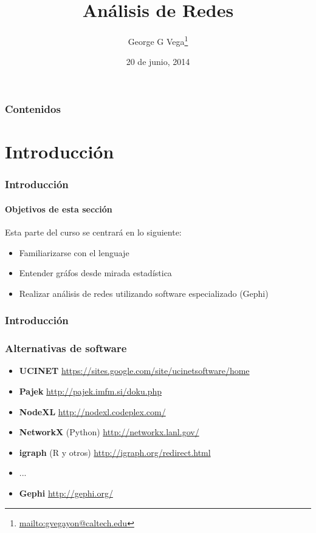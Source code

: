 \documentclass[10pt]{beamer}
\author{George G Vega\thanks{\url{mailto:gvegayon@caltech.edu}}}
\institute{Superintendencia de Pensiones}
\title{An\'alisis de Redes}
\date{20 de junio, 2014}
\begin{document}
\frame{\maketitle}

\begin{frame}
\frametitle{Contenidos}
\tableofcontents
\end{frame}

\section{Introducci\'on}

\begin{frame}
\frametitle{Introducci\'on}
\framesubtitle{Objetivos de esta secci\'on}

Esta parte del curso se centrar\'a en lo siguiente:

\begin{itemize}
\item Familiarizarse con el lenguaje
\item Entender gr\'afos desde mirada estad\'istica
\item Realizar an\'alisis de redes utilizando software especializado (Gephi)
\end{itemize}

\end{frame}

\begin{frame}
\frametitle{Introducci\'on}
\frametitle{Alternativas de software}
\begin{itemize}
\item {\bf UCINET} \url{https://sites.google.com/site/ucinetsoftware/home}
\item {\bf Pajek} \url{http://pajek.imfm.si/doku.php}
\item {\bf NodeXL} \url{http://nodexl.codeplex.com/}
\item {\bf NetworkX} (Python) \url{http://networkx.lanl.gov/}
\item {\bf igraph} (R y otros) \url{http://igraph.org/redirect.html}
\item ...
\item {\bf Gephi} \url{http://gephi.org/}
\end{itemize}
\end{frame}
\end{document}
